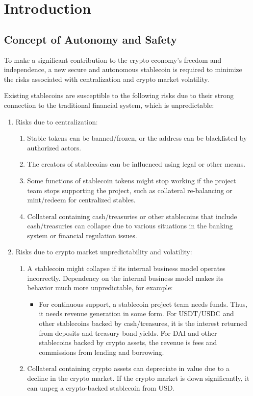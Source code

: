 \section{Introduction}

\subsection{Concept of Autonomy and Safety}

To make a significant contribution to the crypto economy's freedom 
and independence, a new secure and autonomous stablecoin is required 
to minimize the risks associated with centralization and crypto 
market volatility.

Existing stablecoins are susceptible to the following risks due to their 
strong connection to the traditional financial system, which is unpredictable:

\begin{enumerate}
\item Risks due to centralization:
	\begin{enumerate}
		\item Stable tokens can be banned/frozen, or the address can be blacklisted by authorized actors.
    \item The creators of stablecoins can be influenced using legal or other means.
    \item Some functions of stablecoin tokens might stop working if the project
    team stops supporting the project, such as collateral re-balancing or 
    mint/redeem for centralized stables.
    \item Collateral containing cash/treasuries or other stablecoins that include 
    cash/treasuries can collapse due to various situations in the banking system 
    or financial regulation issues.
  \end{enumerate}
\item Risks due to crypto market unpredictability and volatility:
	\begin{enumerate}
    \item A stablecoin might collapse if its internal business model operates incorrectly. 
    Dependency on the internal business model makes its behavior much more unpredictable, for example:
    \begin{itemize}
      \item For continuous support, a stablecoin project team needs funds. Thus, it needs 
      revenue generation in some form. For USDT/USDC and other stablecoins backed 
      by cash/treasures, it is the interest returned from deposits and treasury bond yields. 
      For DAI and other stablecoins backed by crypto assets, the revenue is fees and commissions 
      from lending and borrowing.
    \end{itemize}
    \item Collateral containing crypto assets can depreciate in value due to a decline 
    in the crypto market. If the crypto market is down significantly, it can unpeg 
    a crypto-backed stablecoin from USD.
  \end{enumerate}
\end{enumerate}

